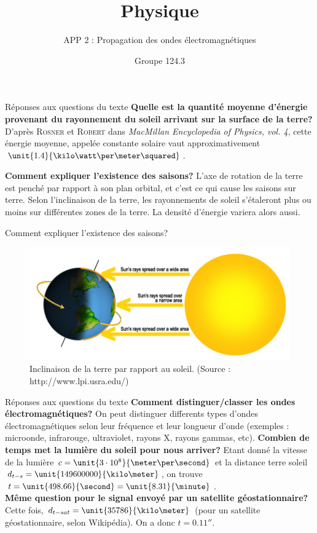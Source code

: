 \documentclass[pdf]{beamer}
\title{Physique}
\subtitle{APP 2 : Propagation des ondes électromagnétiques}
\author{Groupe 124.3}
\begin{document}
\begin{frame}
	\titlepage
\end{frame}

\begin{frame}{Réponses aux questions du texte}
\textbf{Quelle est la quantité moyenne d'énergie provenant du rayonnement du soleil
arrivant sur la surface de la terre?}
D'après \textsc{Rosner} et \textsc{Robert} dans \textit{MacMillan Encyclopedia of Physics, vol. 4}, cette énergie 
moyenne, appelée constante solaire vaut approximativement $\unit{1.4}{\kilo\watt\per\meter\squared}$.


\textbf{Comment expliquer l'existence des saisons?}
L'axe de rotation de la terre est penché par rapport à son plan orbital, et c'est ce qui cause les saisons
sur terre. Selon l'inclinaison de la terre, les rayonnements de soleil s'étaleront plus ou moins
sur différentes zones de la terre. La densité d'énergie variera alors aussi.
\end{frame}

\begin{frame}{Comment expliquer l'existence des saisons?}
	\begin{figure}[ht!]
    \centering
    \includegraphics[scale=0.75]{whyseasons.jpg}
		\caption{Inclinaison de la terre par rapport au soleil. (Source : http://www.lpi.usra.edu/)}
	\end{figure}
\end{frame}

\begin{frame}{Réponses aux questions du texte}
\textbf{Comment distinguer/classer les ondes électromagnétiques?}
On peut distinguer differents types d'ondes électromagnétiques selon leur fréquence
et leur longueur d'onde (exemples : microonde, infrarouge, ultraviolet, rayons X, 
rayons gammas, etc).
\textbf{Combien de temps met la lumière du soleil pour nous arriver?}
Etant donné la vitesse de la lumière $c = \unit{3 \cdot 10^8}{\meter\per\second}$ et la
distance terre soleil $d_{t-s} = \unit{149600000}{\kilo\meter}$, on trouve $t = \unit{498.66}{\second}
= \unit{8.31}{\minute}$. \\
\textbf{Même question pour le signal envoyé par un satellite géostationnaire?}
Cette fois, $d_{t-sat} = \unit{35786}{\kilo\meter}$ (pour un satellite géostationnaire, selon
Wikipédia). On a donc $t = \unit{0.11}{\second}$.
\end{frame}
\end{document}
